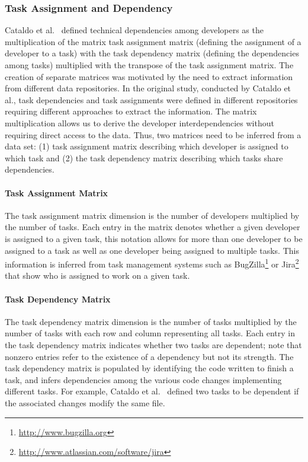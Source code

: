\subsubsection{Task Assignment and Dependency}
Cataldo et al.~\cite{cataldo:cscw:2006} defined  technical dependencies among developers as the multiplication of the matrix task assignment matrix (defining the assignment of a developer to a task) with the task dependency matrix (defining the dependencies among tasks) multiplied with the transpose of the task assignment matrix.
%
The creation of separate matrices was motivated by the need to extract information from different data repositories.
In the original study, conducted by Cataldo et al., task dependencies and task assignments were defined in different repositories requiring different approaches to extract the information.
The matrix multiplication allows us to derive the developer interdependencies without requiring direct access to the data.
%
Thus, two matrices need to be inferred from a data set: (1) task assignment matrix describing which developer is assigned to which task and (2) the task dependency matrix describing which tasks share dependencies.

\paragraph{Task Assignment Matrix}
The task assignment matrix dimension is the number of developers multiplied by the number of tasks.
Each entry in the matrix denotes whether a given developer is assigned to a given task, this notation allows for more than one developer to be assigned to a task as well as one developer being assigned to multiple tasks.
This information is inferred from task management systems such as BugZilla\footnote{\url{http://www.bugzilla.org}} or Jira\footnote{\url{http://www.atlassian.com/software/jira}} that show who is assigned to work on a given task.

\paragraph{Task Dependency Matrix}
The task dependency matrix dimension is the number of tasks multiplied by the number of tasks with each row and column representing all tasks.
Each entry in the task dependency matrix indicates whether two tasks are dependent; note that nonzero entries refer to the existence of a dependency but not its strength.
The task dependency matrix is populated by identifying the code written to finish a task, and infers dependencies among the various code changes implementing different tasks.
For example, Cataldo et al.~\cite{cataldo:cscw:2006} defined two tasks to be dependent if the associated changes modify the same file. 


